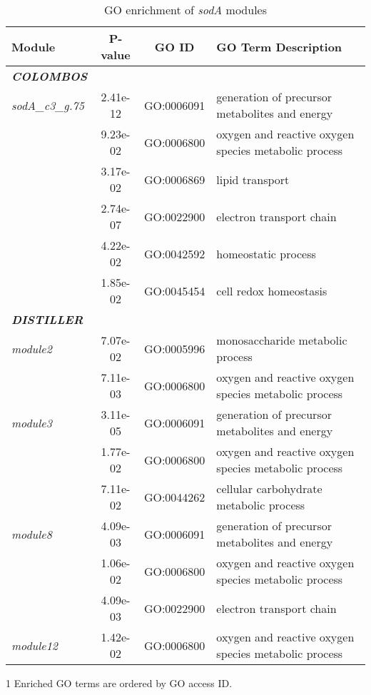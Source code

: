 \begin{table}[tb]
\begin{threeparttable}
	\caption{GO enrichment of \textit{sodA} modules}
	\label{tab:GOenrich}
	\begin{small}
	\begin{tabular}{p{2.2cm} c c p{5.3cm}}
	\toprule
	{\bf Module} & {\bf P-value} & {\bf GO ID} & {\bf GO Term Description} \\
	\midrule
	{\bf\it COLOMBOS} \\
	\hline
	\textit{sodA\_c3\_g.75}	& 2.41e-12 & GO:0006091 & generation of precursor 
	metabolites and energy \\
	& 9.23e-02 & GO:0006800 & oxygen and reactive oxygen species metabolic 
		process \\
	& 3.17e-02 & GO:0006869 & lipid transport \\
	& 2.74e-07&	GO:0022900&	electron transport chain \\
	& 4.22e-02&	GO:0042592&	homeostatic process \\	
	& 1.85e-02&	GO:0045454&	cell redox homeostasis \\[2ex]
	{\bf\it DISTILLER} \\
	\hline
	\textit{module2} & 7.07e-02&	GO:0005996&	monosaccharide metabolic 
	process \\
	& 7.11e-03&	GO:0006800&	oxygen and reactive oxygen species metabolic 
		process \\
	\hline
	\textit{module3} & 3.11e-05&	GO:0006091& generation of precursor 
	metabolites 
	and energy \\
	& 1.77e-02&	GO:0006800&	oxygen and reactive oxygen species metabolic 
	process \\
	& 7.11e-02&	GO:0044262&	cellular carbohydrate metabolic process \\
	\hline
	\textit{module8} & 4.09e-03&	GO:0006091&	generation of precursor 
	metabolites 
	and energy \\
	& 1.06e-02&	GO:0006800&	oxygen and reactive oxygen species metabolic 
	process \\
	& 4.09e-03&	GO:0022900&	electron transport chain \\
	\hline
	\textit{module12}& 1.42e-02& GO:0006800& oxygen and reactive oxygen 
	species metabolic process \\
	\bottomrule
	\end{tabular}
	\begin{tablenotes}
	\item[1] Enriched GO terms are ordered by GO access ID.
	\end{tablenotes}
	\end{small}
\end{threeparttable}
\end{table}



